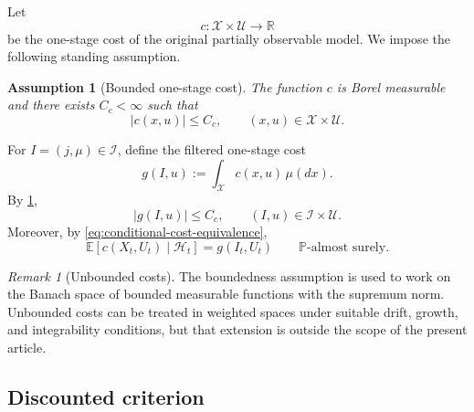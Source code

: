 \documentclass[10pt,twocolumn]{article}
\newtheorem{assumption}{Assumption}
\theoremstyle{remark}
\newtheorem{remark}{Remark}
\newcommand{\R}{\mathbb{R}}
\newcommand{\E}{\mathbb{E}}
\newcommand{\Pp}{\mathbb{P}}
\newcommand{\Hh}{\mathcal{H}}
\newcommand{\Ucal}{\mathcal{U}}
\newcommand{\Xcal}{\mathcal{X}}
\newcommand{\Ical}{\mathcal{I}}
\begin{document}
Let
\[
c:\Xcal\times\Ucal\longrightarrow\R
\]
be the one-stage cost of the original partially observable model. We impose the following standing assumption.

\begin{assumption}[Bounded one-stage cost]
	\label{ass:bounded-cost}
	The function \(c\) is Borel measurable and there exists \(C_c<\infty\) such that
	\begin{equation}
		|c(x,u)|\leq C_c,
		\qquad (x,u)\in\Xcal\times\Ucal.
		\label{eq:bounded-hidden-cost}
	\end{equation}
\end{assumption}

For \(I=(j,\mu)\in\Ical\), define the filtered one-stage cost
\begin{equation}
	g(I,u)
	:=\int_{\Xcal}c(x,u)\,\mu(dx).
	\label{eq:filtered-one-stage-cost-section6}
\end{equation}
By \cref{ass:bounded-cost},
\begin{equation}
	|g(I,u)|\leq C_c,
	\qquad (I,u)\in\Ical\times\Ucal.
	\label{eq:bounded-filtered-cost}
\end{equation}
Moreover, by \cref{eq:conditional-cost-equivalence},
\begin{equation}
	\E[c(X_t,U_t)\mid\Hh_t]
	=g(I_t,U_t)
	\qquad \Pp\text{-almost surely}.
	\label{eq:filtered-cost-conditional-section6}
\end{equation}

\begin{remark}[Unbounded costs]
	\label{rem:unbounded-costs}
	The boundedness assumption is used to work on the Banach space of bounded measurable functions with the supremum norm. Unbounded costs can be treated in weighted spaces under suitable drift, growth, and integrability conditions, but that extension is outside the scope of the present article.
\end{remark}

\subsection{Discounted criterion}
\label{subsec:discounted-criterion}
\end{document}
